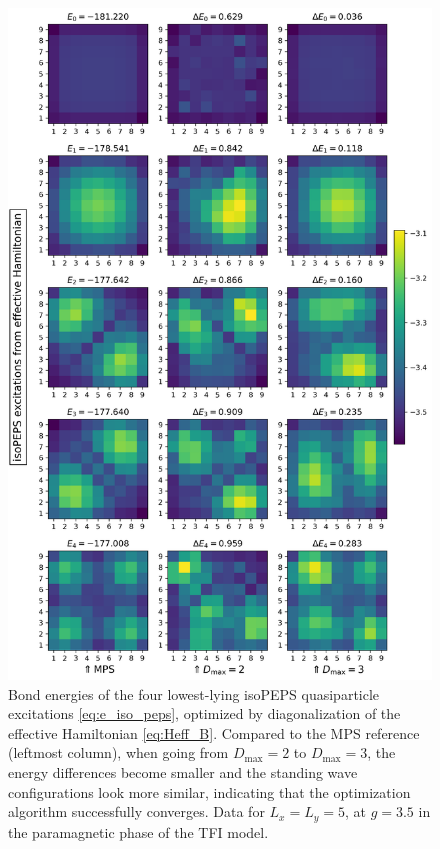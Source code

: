 \newpage
\begin{figure}[H]
  \centering
  \includegraphics[width=0.85\linewidth]{excitations_5_5_3.5_effective.png}
  \caption{Bond energies of the four lowest-lying isoPEPS quasiparticle excitations \eqref{eq:e_iso_peps}, optimized by diagonalization of the effective Hamiltonian \eqref{eq:Heff_B}. Compared to the MPS reference (leftmost column), when going from $D_{\text{max}} = 2$ to $D_{\text{max}} = 3$, the energy differences become smaller and the standing wave configurations look more similar, indicating that the optimization algorithm successfully converges. Data for $L_x = L_y = 5$, at $g = 3.5$ in the paramagnetic phase of the TFI model.}
 \label{fig:excitations_effective}
\end{figure}
